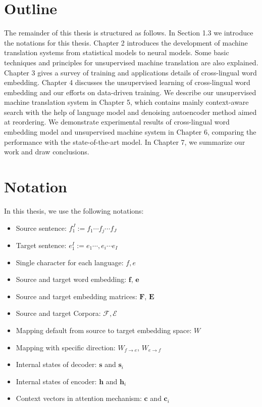 \section{Outline}
The remainder of this thesis is structured as follows. In Section 1.3 we introduce the notations for this thesis. 
Chapter 2 introduces the development of machine translation systems from statistical models to  neural models. Some basic techniques and principles for unsupervised machine translation are also explained.  Chapter 3 gives a survey of training and applications details of cross-lingual word embedding. Chapter 4 discusses the unsupervised learning of cross-lingual word embedding and our efforts on data-driven training. We describe our unsupervised machine translation system in Chapter 5, which contains mainly context-aware search with the help of language model and denoising autoencoder method aimed at reordering. We demonstrate experimental results of cross-lingual word embedding model and unsupervised machine system in Chapter 6, comparing the performance with the state-of-the-art model. In Chapter 7, we summarize our work and draw conclusions.


\section{Notation}
In this thesis, we use the following notations:
\begin{itemize}
	\item Source sentence:  ${f_1^J:= f_1 \cdots  f_j \cdots f_J}$ 
	\item Target sentence:  ${e_1^I:= e_1 \cdots, e_i \cdots e_I}$
	\item Single character for each language: $f,e$ 
	\item Source and target word embedding: $\bm{f}$, $\bm{e}$
	\item Source and target embedding matrices: $\bm{F}$, $\bm{E}$
	\item Source and target Corpora: $\mathcal{F}, \mathcal{E}$
	\item Mapping default from source to target embedding space: $W$
	\item Mapping with specific direction: $W_{f\rightarrow e}$, $W_{e\rightarrow f}$
	\item Internal states of decoder: $\bm{s}$ and $\bm{s}_i$  
	\item Internal states of encoder: $\bm{h}$ and $\bm{h}_i$ 
	\item Context vectors in attention mechanism: $\bm{c}$ and $\bm{c}_i$ 

\end{itemize}










